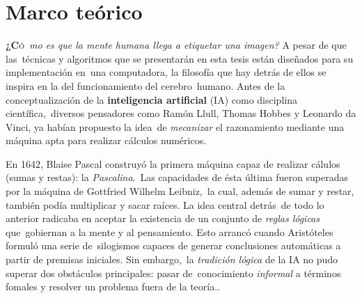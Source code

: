 \chapter{Marco teórico}

\noindent
\lettrine[lines=2, lhang=0.33, loversize=0.25]{\textbf{¿C}}{ó}\
\emph{mo es que la mente humana llega a etiquetar una imagen?} A pesar de que las\
técnicas y algoritmos que se presentarán en esta tesis están diseñados para su implementación en\
una computadora, la filosofía que hay detrás de ellos se inspira en la del funcionamiento del cerebro\
humano. Antes de la conceptualización de la \textbf{inteligencia artificial} (IA) como disciplina científica,\
diversos pensadores como Ramón Llull, Thomas Hobbes y Leonardo da Vinci, ya habían propuesto la idea\
de \emph{mecanizar} el razonamiento mediante una máquina apta para realizar cálculos numéricos. \cite{russell2010}\par
En 1642, Blaise Pascal construyó la primera máquina capaz de realizar cálulos (sumas y restas): la \emph{Pascalina}.\
Las capacidades de ésta última fueron superadas por la máquina de Gottfried Wilhelm Leibniz,\
la cual, además de sumar y restar, también podía multiplicar y sacar raíces. La idea central detrás\
de todo lo anterior radicaba en aceptar la existencia de un conjunto de \emph{reglas lógicas} que\
gobiernan a la mente y al pensamiento. Esto arrancó cuando Aristóteles formuló una serie de\
silogismos capaces de generar conclusiones automáticas a partir de premisas iniciales. Sin embargo,\
la \emph{tradición lógica} de la IA no pudo superar dos obstáculos principales: pasar de\
conocimiento \emph{informal} a términos fomales y resolver un problema fuera de la teoría.\cite{russell2010}.\par




